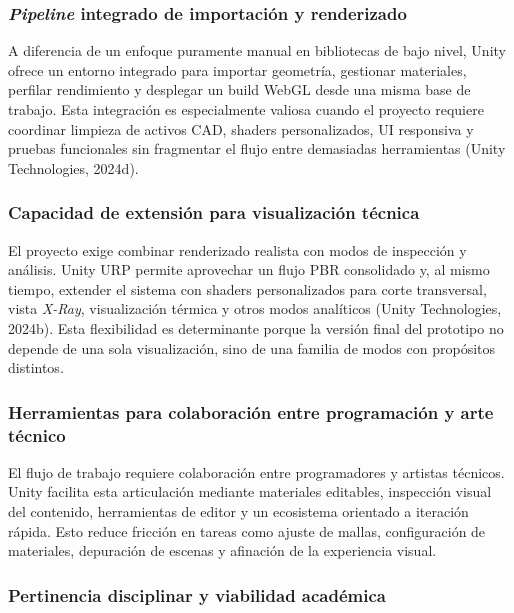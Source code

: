 \subsubsection{\textit{Pipeline} integrado de importaci\'on y renderizado}

A diferencia de un enfoque puramente manual en bibliotecas de bajo nivel, Unity ofrece un entorno integrado para importar geometr\'ia, gestionar materiales, perfilar rendimiento y desplegar un build WebGL desde una misma base de trabajo. Esta integraci\'on es especialmente valiosa cuando el proyecto requiere coordinar limpieza de activos CAD, shaders personalizados, UI responsiva y pruebas funcionales sin fragmentar el flujo entre demasiadas herramientas (Unity Technologies, 2024d).

\subsubsection{Capacidad de extensi\'on para visualizaci\'on t\'ecnica}

El proyecto exige combinar renderizado realista con modos de inspecci\'on y an\'alisis. Unity URP permite aprovechar un flujo PBR consolidado y, al mismo tiempo, extender el sistema con shaders personalizados para corte transversal, vista \textit{X-Ray}, visualizaci\'on t\'ermica y otros modos anal\'iticos (Unity Technologies, 2024b). Esta flexibilidad es determinante porque la versi\'on final del prototipo no depende de una sola visualizaci\'on, sino de una familia de modos con prop\'ositos distintos.

\subsubsection{Herramientas para colaboraci\'on entre programaci\'on y arte t\'ecnico}

El flujo de trabajo requiere colaboraci\'on entre programadores y artistas t\'ecnicos. Unity facilita esta articulaci\'on mediante materiales editables, inspecci\'on visual del contenido, herramientas de editor y un ecosistema orientado a iteraci\'on r\'apida. Esto reduce fricci\'on en tareas como ajuste de mallas, configuraci\'on de materiales, depuraci\'on de escenas y afinaci\'on de la experiencia visual.

\subsubsection{Pertinencia disciplinar y viabilidad acad\'emica}

